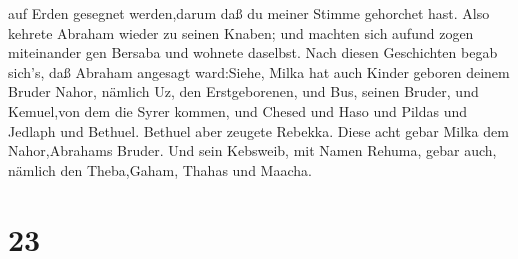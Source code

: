 auf Erden gesegnet werden,darum daß du meiner Stimme gehorchet hast.
 Also kehrete Abraham wieder zu seinen Knaben; und machten
sich aufund zogen miteinander gen Bersaba und wohnete daselbst.
 Nach diesen Geschichten begab sich's, daß Abraham angesagt
ward:Siehe, Milka hat auch Kinder geboren deinem Bruder Nahor,
 nämlich Uz, den Erstgeborenen, und Bus, seinen Bruder, und
Kemuel,von dem die Syrer kommen,  und Chesed und Haso und
Pildas und Jedlaph und Bethuel.  Bethuel aber zeugete
Rebekka. Diese acht gebar Milka dem Nahor,Abrahams Bruder. 
Und sein Kebsweib, mit Namen Rehuma, gebar auch, nämlich den
Theba,Gaham, Thahas und Maacha.

\hypertarget{section-22}{%
\section{23}\label{section-22}}


